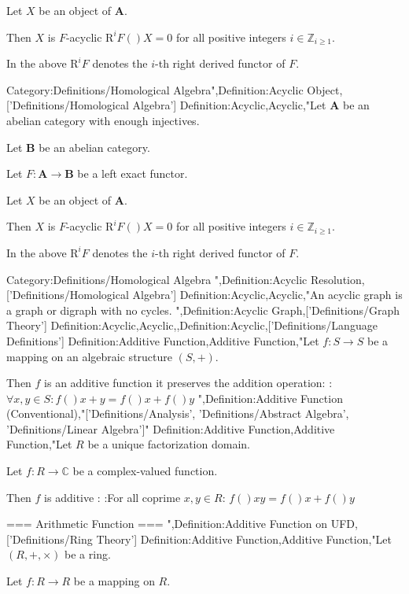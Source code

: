 Let $X$ be an object of $\mathbf A$.


Then $X$ is $F$-acyclic  $\mathrm R^i F \left(   \right)X = 0$ for all positive integers $i \in \mathbb Z_{i \mathop \ge 1}$.

In the above $\mathrm R^i F$ denotes the $i$-th right derived functor of $F$.


Category:Definitions/Homological Algebra",Definition:Acyclic Object,['Definitions/Homological Algebra']
Definition:Acyclic,Acyclic,"Let $\mathbf A$ be an abelian category with enough injectives.

Let $\mathbf B$ be an abelian category.

Let $F : \mathbf A \to \mathbf B$ be a left exact functor.

Let $X$ be an object of $\mathbf A$.


Then $X$ is $F$-acyclic  $\mathrm R^i F \left(   \right)X = 0$ for all positive integers $i \in \mathbb Z_{i \mathop \ge 1}$.

In the above $\mathrm R^i F$ denotes the $i$-th right derived functor of $F$.


Category:Definitions/Homological Algebra
",Definition:Acyclic Resolution,['Definitions/Homological Algebra']
Definition:Acyclic,Acyclic,"An acyclic graph is a graph or digraph with no cycles.
",Definition:Acyclic Graph,['Definitions/Graph Theory']
Definition:Acyclic,Acyclic,,Definition:Acyclic,['Definitions/Language Definitions']
Definition:Additive Function,Additive Function,"Let $f: S \to S$ be a mapping on an algebraic structure $\left( S, + \right)$.


Then $f$ is an additive function  it preserves the addition operation:
:$\forall x, y \in S: f \left(   \right){x + y} = f \left(   \right)x + f \left(   \right)y$
",Definition:Additive Function (Conventional),"['Definitions/Analysis', 'Definitions/Abstract Algebra', 'Definitions/Linear Algebra']"
Definition:Additive Function,Additive Function,"Let $R$ be a unique factorization domain.

Let $f : R \to \mathbb C$ be a complex-valued function.


Then $f$ is additive :
:For all coprime $x, y \in R$: $f \left(   \right){x y} = f \left(   \right)x + f \left(   \right)y$


=== Arithmetic Function ===
",Definition:Additive Function on UFD,['Definitions/Ring Theory']
Definition:Additive Function,Additive Function,"Let $\left( R, +, \times \right)$ be a ring.

Let $f: R \to R$ be a mapping on $R$.


